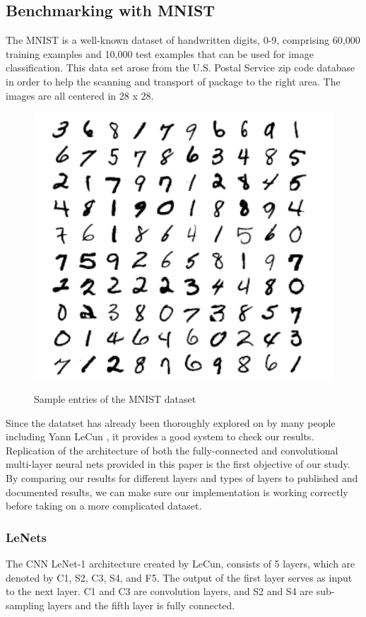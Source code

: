 \documentclass[12pt, twocolumn]{article}
\begin{document}
\subsection{Benchmarking with MNIST}


The MNIST is a well-known dataset of handwritten digits, 0-9, comprising 60,000 training examples and 10,000 test examples \cite{MNIST}  that can be used for image classification.  This data set arose from the U.S. Postal Service zip code database in order to help the scanning and transport of package to the right area. The images are all centered in 28 x 28.

\begin{figure}
\includegraphics[scale=.8]{MNISTnos.png}
\label{fig:MNISTex}
\caption{Sample entries of the MNIST dataset \cite{LeCun1998}}
\end{figure}

Since the datatset has already been thoroughly explored on by many people including Yann LeCun \cite{LeCun1998}, it provides a good system to check our results.  Replication of the architecture of both the fully-connected and convolutional multi-layer neural nets provided in this paper is the first objective of our study. By comparing our results for different layers and types of layers to published and documented results, we can make sure our implementation is working correctly before taking on a more complicated dataset. 

\subsubsection{LeNets}
The CNN LeNet-1 architecture created by LeCun, consists of 5 layers, which are denoted by C1, S2, C3, S4, and F5.  The output of the first layer serves as
input to the next layer. C1 and C3 are convolution layers, and S2 and S4 are sub-sampling layers and the fifth layer is fully connected. \cite{LeCun89}
\end{document}
